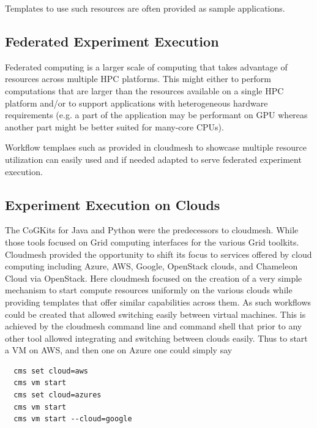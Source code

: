 \documentclass[utf8]{FrontiersinVancouver} %
\begin{document}
Templates to use such resources are often provided as sample applications.

\subsection{Federated Experiment Execution}

Federated computing is a larger scale of computing that takes advantage of resources across multiple HPC platforms. This might either to perform computations that are larger than the resources available on a single HPC platform and/or to support applications with heterogeneous hardware requirements (e.g. a part of the application may be performant on GPU whereas another part might be better suited for many-core CPUs). 

Workflow templaes such as provided in cloudmesh to showcase multiple resource utilization can easily used and if needed adapted to serve federated experiment execution. 

\subsection{Experiment Execution on Clouds}

The CoGKits for Java and Python were the predecessors to cloudmesh. While those tools focused on Grid computing interfaces for the various Grid toolkits. Cloudmesh provided the opportunity to shift its focus to services offered by cloud computing including Azure, AWS, Google, OpenStack clouds, and Chameleon Cloud via OpenStack. Here cloudmesh focused on the creation of a very simple mechanism to start compute resources uniformly on the various clouds while providing templates that offer similar capabilities across them. As such workflows could be created that allowed switching easily between virtual machines. This is achieved by the cloudmesh command line and command shell that prior to any other tool allowed integrating and switching between clouds easily. Thus to start a VM on AWS, and then one on Azure one could simply say

\begin{verbatim}
  cms set cloud=aws
  cms vm start
  cms set cloud=azures
  cms vm start
  cms vm start --cloud=google
\end{verbatim}
\end{document}
